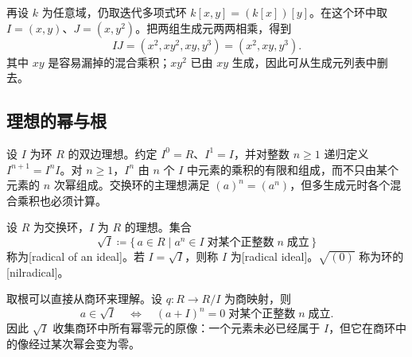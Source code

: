 \ProseParagraphBreak
再设 \(k\) 为任意域，仍取迭代多项式环 \(k[x,y]=(k[x])[y]\)。在这个环中取 \(I=(x,y)\)、\(J=(x,y^2)\)。把两组生成元两两相乘，得到
\[
	IJ=(x^2,xy^2,xy,y^3)=(x^2,xy,y^3).
\]
其中 \(xy\) 是容易漏掉的混合乘积；\(xy^2\) 已由 \(xy\) 生成，因此可从生成元列表中删去。

\subsection{理想的幂与根}
\label{b1:subsec:1003:02}
设 \(I\) 为环 \(R\) 的双边理想。约定 \(I^0=R\)、\(I^1=I\)，并对整数 \(n\geq1\) 递归定义 \(I^{n+1}=I^nI\)。对 \(n\geq1\)，\(I^n\) 由 \(n\) 个 \(I\) 中元素的乘积的有限和组成，而不只由某个元素的 \(n\) 次幂组成。交换环的主理想满足 \((a)^n=(a^n)\)，但多生成元时各个混合乘积也必须计算。

\begin{definition}\label{b1:def:radical-ideal}
	设 \(R\) 为交换环，\(I\) 为 \(R\) 的理想。集合
	\[
		\sqrt I\coloneqq\{\,a\in R\mid a^n\in I\;\text{对某个正整数}\;n\;\text{成立}\,\}
	\]
	称为[radical of an ideal]。若 \(I=\sqrt I\)，则称 \(I\) 为[radical ideal]。\(\sqrt{(0)}\) 称为环的[nilradical]。
\end{definition}

取根可以直接从商环来理解。设 \(q:R\to R/I\) 为商映射，则
\[
	a\in\sqrt I \quad\Longleftrightarrow\quad (a+I)^n=0\;\text{对某个正整数}\;n\;\text{成立}.
\]
因此 \(\sqrt I\) 收集商环中所有幂零元的原像：一个元素未必已经属于 \(I\)，但它在商环中的像经过某次幂会变为零。

